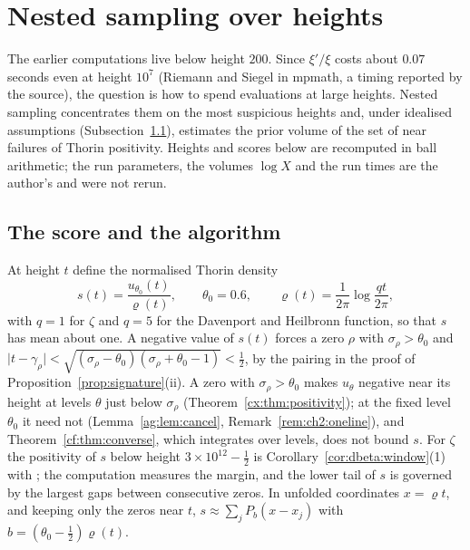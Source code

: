 \section{Nested sampling over heights}\label{cf:sec:ns}

The earlier computations live below height $200$. Since $\xi'/\xi$ costs about $0.07$ seconds even at height $10^7$ (Riemann and Siegel in mpmath, a timing reported by the source), the question is how to spend evaluations at large heights. Nested sampling \cite{Skilling06} concentrates them on the most suspicious heights and, under idealised assumptions (Subsection~\ref{cf:sec:nsalg}), estimates the prior volume of the set of near failures of Thorin positivity. Heights and scores below are recomputed in ball arithmetic; the run parameters, the volumes $\log X$ and the run times are the author's and were not rerun.

\subsection{The score and the algorithm}\label{cf:sec:nsalg}

At height $t$ define the normalised Thorin density
\[
s(t)=\frac{u_{\theta_0}(t)}{\varrho(t)},\qquad \theta_0=0.6,\qquad \varrho(t)=\frac{1}{2\pi}\log\frac{qt}{2\pi},
\]
with $q=1$ for $\zeta$ and $q=5$ for the Davenport and Heilbronn function, so that $s$ has mean about one. A negative value of $s(t)$ forces a zero $\rho$ with $\sigma_\rho>\theta_0$ and $\lvert t-\gamma_\rho\rvert<\sqrt{(\sigma_\rho-\theta_0)(\sigma_\rho+\theta_0-1)}<\frac12$, by the pairing in the proof of Proposition~\ref{prop:signature}(ii). A zero with $\sigma_\rho>\theta_0$ makes $u_\theta$ negative near its height at levels $\theta$ just below $\sigma_\rho$ (Theorem~\ref{cx:thm:positivity}); at the fixed level $\theta_0$ it need not (Lemma~\ref{ag:lem:cancel}, Remark~\ref{rem:ch2:oneline}), and Theorem~\ref{cf:thm:converse}, which integrates over levels, does not bound $s$. For $\zeta$ the positivity of $s$ below height $3\times10^{12}-\frac12$ is Corollary~\ref{cor:dbeta:window}(1) with \cite{PT21}; the computation measures the margin, and the lower tail of $s$ is governed by the largest gaps between consecutive zeros. In unfolded coordinates $x=\varrho t$, and keeping only the zeros near $t$, $s\approx\sum_jP_b(x-x_j)$ with $b=(\theta_0-\frac12)\varrho(t)$.

